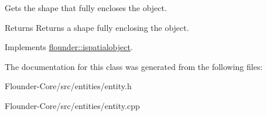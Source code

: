 Gets the shape that fully encloses the object. 

\begin{DoxyReturn}{Returns}
Returns a shape fully enclosing the object. 
\end{DoxyReturn}


Implements \hyperlink{classflounder_1_1ispatialobject_af3867cbb5f35b0296a16af77703e6c81}{flounder\+::ispatialobject}.



The documentation for this class was generated from the following files\+:\begin{DoxyCompactItemize}
\item 
Flounder-\/\+Core/src/entities/entity.\+h\item 
Flounder-\/\+Core/src/entities/entity.\+cpp\end{DoxyCompactItemize}
